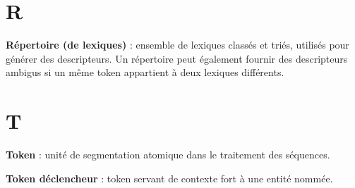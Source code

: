 \documentclass[PhD-Yoann-Dupont.tex]{subfiles}
\begin{document}
\section*{R}
\textbf{Répertoire (de lexiques)} : ensemble de lexiques classés et triés, utilisés pour générer des descripteurs. Un répertoire peut également fournir des descripteurs ambigus si un même token appartient à deux lexiques différents.

\section*{T}
\textbf{Token} : unité de segmentation atomique dans le traitement des séquences.

\textbf{Token déclencheur} : token servant de contexte fort à une entité nommée.
\end{document}
